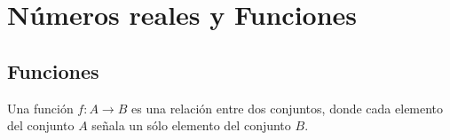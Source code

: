 \documentclass[Análisis.root.tex]{subfiles}
\begin{document}
    \section{Números reales y Funciones}
    \subsection{Funciones}
        Una función $f: A \rightarrow B$ es una relación entre dos conjuntos, donde cada elemento del conjunto $A$ señala un sólo elemento del conjunto $B$.
\end{document}
